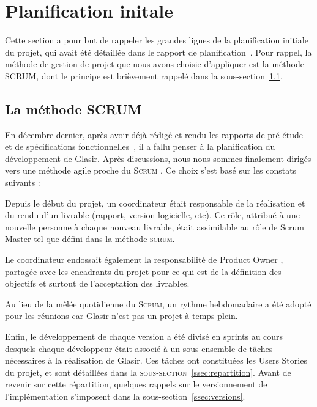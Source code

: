 \section{Planification initale}
\label{sec:planifInit}

Cette section a pour but de rappeler les grandes lignes de la planification initiale du projet, qui avait été détaillée dans le rapport de planification~\cite{planif}. Pour rappel, la méthode de gestion de projet que nous avons choisie d'appliquer est la méthode SCRUM, dont le principe est brièvement rappelé dans la {\sc sous-section}~\ref{ssec:scrum}.

\subsection{La méthode SCRUM}
\label{ssec:scrum}

En décembre dernier, après avoir déjà rédigé et rendu les rapports de pré-étude~\cite{pre_etude} et de spécifications fonctionnelles~\cite{spec_fonc}, il a fallu penser à la planification du développement de Glasir. Après discussions, nous nous sommes finalement dirigés vers une méthode agile proche du \og \textsc{Scrum} \fg{}. Ce choix s'est basé sur les constats suivants :

Depuis le début du projet, un \og coordinateur \fg{} était responsable de la réalisation et du rendu d'un livrable (rapport, version logicielle, etc). Ce rôle, attribué à une nouvelle personne à chaque nouveau livrable, était assimilable au rôle de \og Scrum Master \fg{} tel que défini dans la méthode \textsc{scrum}.

Le coordinateur endossait également la responsabilité de \og Product Owner \fg{}, partagée avec les encadrants du projet pour ce qui est de la définition des objectifs et surtout de l'acceptation des livrables.

Au lieu de la mêlée quotidienne du \textsc{Scrum}, un rythme hebdomadaire a été adopté pour les réunions car Glasir n'est pas un projet à temps plein. 

Enfin, le développement de chaque version a été divisé en sprints au cours desquels chaque développeur était associé à un sous-ensemble de tâches nécessaires à la réalisation de Glasir. Ces tâches ont constituées les \og Users Stories \fg{} du projet, et sont détaillées dans la \textsc{sous-section}~\ref{ssec:repartition}. Avant de revenir sur cette répartition, quelques rappels sur le versionnement de l'implémentation s'imposent dans la {\sc sous-section}~\ref{ssec:versions}.

